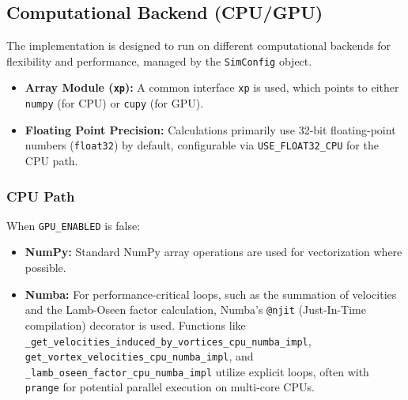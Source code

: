 \documentclass[12pt,letterpaper]{article}
\newcommand{\xp}{\texttt{xp}\xspace}
\begin{document}
\subsection{Computational Backend (CPU/GPU)}
The implementation is designed to run on different computational backends for flexibility and performance, managed by the \texttt{SimConfig} object.
\begin{itemize}
    \item \textbf{Array Module (\xp):} A common interface \xp is used, which points to either \texttt{numpy} (for CPU) or \texttt{cupy} (for GPU).
    \item \textbf{Floating Point Precision:} Calculations primarily use 32-bit floating-point numbers (\texttt{float32}) by default, configurable via \texttt{USE\_FLOAT32\_CPU} for the CPU path.
\end{itemize}

\subsubsection{CPU Path}
When \texttt{GPU\_ENABLED} is false:
\begin{itemize}
    \item \textbf{NumPy:} Standard NumPy array operations are used for vectorization where possible.
    \item \textbf{Numba:} For performance-critical loops, such as the summation of velocities and the Lamb-Oseen factor calculation, Numba's \texttt{@njit} (Just-In-Time compilation) decorator is used. Functions like \\\texttt{\_get\_velocities\_induced\_by\_vortices\_cpu\_numba\_impl}, \\\texttt{get\_vortex\_velocities\_cpu\_numba\_impl}, and \\\texttt{\_lamb\_oseen\_factor\_cpu\_numba\_impl} utilize explicit loops, often with \texttt{prange} for potential parallel execution on multi-core CPUs.
\end{itemize}
\end{document}
